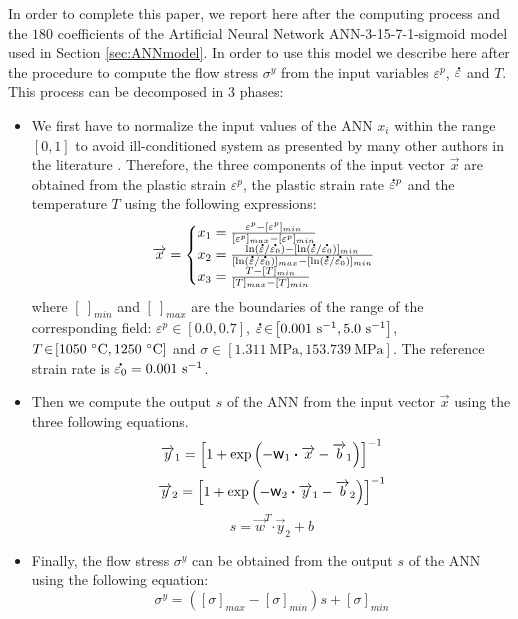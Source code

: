 \documentclass[twoside,english,1p,final,sort&compress]{elsarticle}
\theoremstyle{plain}
\DeclareRobustCommand{\w}{\mbox{\large\ensuremath{\mathsf{w}}}}
\DeclareRobustCommand{\dotp}{\boldsymbol{\cdot}}
\DeclareRobustCommand{\mdot}[1]{\accentset{\mbox{\bfseries .}}{#1}}
\DeclareRobustCommand{\ps}{\text{s}^{-1}}
\DeclareRobustCommand{\MPa}{\text{MPa}}
\begin{document}
In order to complete this paper, we report here after the computing process and the $180$ coefficients of the Artificial Neural Network ANN-3-15-7-1-sigmoid model used in Section \ref{sec:ANNmodel}.
In order to use this model we describe here after the procedure to compute the flow stress $\sigma^y$ from the input variables $\varepsilon^p$, $\mdot\varepsilon$ and $T$.
This process can be decomposed in 3 phases:
\begin{itemize}
\item We first have to normalize the input values of the ANN $x_i$ within the range $[0,1]$ to avoid ill-conditioned system as presented by many other authors in the literature \cite{Lin-2008-ANN, Lu-2011-ANN}.
Therefore, the three components of the input vector $\overrightarrow{x}$ are obtained from the plastic strain $\varepsilon^p$, the plastic strain rate $\mdot{\varepsilon}^p$ and the temperature $T$ using the following expressions:
\begin{equation}
\overrightarrow{x}=
\begin{cases}
x_1 = \frac{\varepsilon^p - [\varepsilon^p]_{min}}{[\varepsilon^p]_{max} - [\varepsilon^p]_{min}}\\
x_2 = \frac{\ln(\mdot{\varepsilon}/\mdot{\varepsilon_0})-[\ln(\mdot{\varepsilon}/\mdot{\varepsilon_0})]_{min}}{[\ln(\mdot{\varepsilon}/\mdot{\varepsilon_0})]_{max}-[\ln(\mdot{\varepsilon}/\mdot{\varepsilon_0})]_{min}}\label{eq:CR1}\\
x_3 = \frac{T-[T]_{min}}{[T]_{max}-[T]_{min}}
\end{cases}
\end{equation}
where $[~]_{min}$ and $[~]_{max}$  are the boundaries of the range of the corresponding field: $\varepsilon^p\!\in\!\left[0.0,0.7\right]$, $\mdot{\varepsilon}\!\in\!\left[0.001~\ps,5.0~\ps\right]$, $T\!\in\!\left[1050~\celsius,1250~\celsius\right]$ and $\sigma\!\in\!\left[1.311~\MPa,153.739~\MPa\right]$.
The reference strain rate is $\mdot{\varepsilon_0} = 0.001~\ps$.
\item Then we compute the output $s$ of the ANN from the input vector $\overrightarrow{x}$ using the three following equations.
\begin{equation}
\overrightarrow{y}_1 = \left[1 + \exp{\left(- \w_1 \dotp \overrightarrow{x}- \overrightarrow{b}_1\right)}\right]^{-1}
\end{equation}
\begin{equation}
\overrightarrow{y}_2 = \left[1 + \exp{\left(- \w_2 \dotp \overrightarrow{y}_1- \overrightarrow{b}_2\right)}\right]^{-1}
\end{equation}
\begin{equation}
s = \overrightarrow{w}^T \dotp \overrightarrow{y}_2 + b
\end{equation}
\item Finally, the flow stress $\sigma^y$ can be obtained from the output $s$ of the ANN using the following equation:
\begin{equation}
\sigma^y =  \left([\sigma]_{max}-[\sigma]_{min}\right)s + [\sigma]_{min} \label{eq:CR2}
\end{equation}
\end{itemize}
\end{document}
